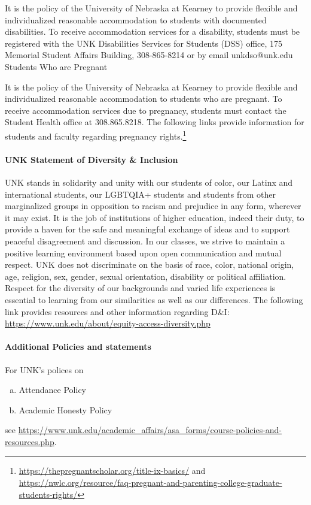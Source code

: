 \documentclass[12pt,fullpage]{article}
\newcounter{ex}\setcounter{ex}{0}
\newenvironment{alphalist}{
  \begin{enumerate}[(a)]
    \addtolength{\itemsep}{-0.5\itemsep}}
  {\end{enumerate}}
\begin{document}
It is the policy of the University of Nebraska at Kearney to provide flexible and individualized reasonable accommodation to students with documented disabilities. To receive accommodation services for a disability, students must be registered with the UNK Disabilities Services for Students (DSS) office, 175 Memorial Student Affairs Building, 308-865-8214 or by email unkdso@unk.edu  
Students Who are Pregnant

It is the policy of the University of Nebraska at Kearney to provide flexible and individualized reasonable accommodation to students who are pregnant. To receive accommodation services due to pregnancy, students must contact the Student Health office at 308.865.8218. The following links provide information for students and faculty regarding pregnancy rights.\footnote{\tiny  \url{https://thepregnantscholar.org/title-ix-basics/} and  \url{https://nwlc.org/resource/faq-pregnant-and-parenting-college-graduate-students-rights/} \normalsize}

\paragraph{UNK Statement of Diversity \& Inclusion}

UNK stands in solidarity and unity with our students of color, our Latinx and international students, our LGBTQIA+ students and students from other marginalized groups in opposition to racism and prejudice in any form, wherever it may exist. It is the job of institutions of higher education, indeed their duty, to provide a haven for the safe and meaningful exchange of ideas and to support peaceful disagreement and discussion. In our classes, we strive to maintain a positive learning environment based upon open communication and mutual respect. UNK does not discriminate on the basis of race, color, national origin, age, religion, sex, gender, sexual orientation, disability or political affiliation. Respect for the diversity of our backgrounds and varied life experiences is essential to learning from our similarities as well as our differences. The following link provides resources and other information regarding D\&I: \url{https://www.unk.edu/about/equity-access-diversity.php}

\paragraph{Additional Policies and statements}

For UNK's polices on
\begin{alphalist} 
  \item Attendance Policy
  \item Academic Honesty Policy 
\end{alphalist}
see \small \url{https://www.unk.edu/academic_affairs/asa_forms/course-policies-and-resources.php}.
\normalsize 
\end{document}
